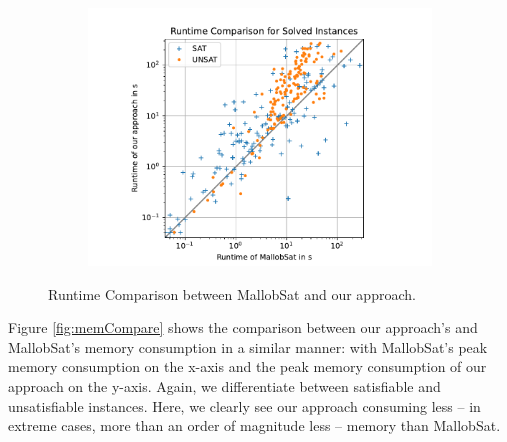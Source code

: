 \documentclass[12pt,a4paper,twoside]{scrartcl}
\numberwithin{equation}{section}
\begin{document}
\begin{figure}[!h]
\begin{subfigure}[c]{.45\textwidth}
    \center
    \includegraphics[scale=.45]{plots/square_runtime_compare/square_runtime_16node.pdf}
    \label{fig:runtimeCompare16node}
  \end{subfigure}
  \caption{Runtime Comparison between MallobSat and our approach.}
  \label{fig:runtimeCompare}
\end{figure}

Figure \ref{fig:memCompare} shows the comparison between our approach's and MallobSat's memory consumption in a similar manner: with MallobSat's peak memory consumption on the x-axis and the peak memory consumption of our approach on the y-axis. Again, we differentiate between satisfiable and unsatisfiable instances. Here, we clearly see our approach consuming less -- in extreme cases, more than an order of magnitude less -- memory than MallobSat.
\end{document}
